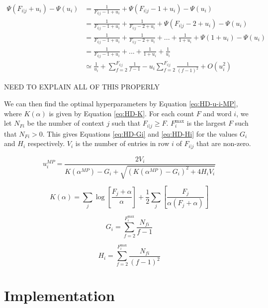 \begin{align}
\Psi(F_{i|j}+u_{i})-\Psi(u_{i})&=\frac{1}{F_{i|j}-1+u_{i}}+\Psi(F_{i|j}-1+u_{i})-\Psi(u_{i}) \nonumber
\\
&=\frac{1}{F_{i|j}-1+u_{i}}+\frac{1}{F_{i|j}-2+u_{i}}+\Psi(F_{i|j}-2+u_{i})-\Psi(u_{i}) \nonumber
\\
&=\frac{1}{F_{i|j}-1+u_{i}}+\frac{1}{F_{i|j}-2+u_{i}}+...+\frac{1}{1+u_{i}}+\Psi(1+u_{i})-\Psi(u_{i}) \nonumber
\\
&=\frac{1}{F_{i|j}-1+u_{i}}+...+\frac{1}{1+u_{i}}+\frac{1}{u_{i}} \nonumber
\\
&\simeq \frac{1}{u_{i}}+\sum_{f=2}^{F_{i|j}}\frac{1}{f-1}-u_{i}\sum_{f=2}^{F_{i|j}}\frac{1}{(f-1)^{2}}+O(u_{i}^{2})
\label{eq:HD-digamma-F-u}
\end{align}

NEED TO EXPLAIN ALL OF THIS PROPERLY


We can then find the optimal hyperparameters by Equation \ref{eq:HD-u-i-MP}, where $K(\alpha)$ is given by Equation \ref{eq:HD-K}. For each count $F$ and word $i$, we let $N_{Fi}$ be the number of context $j$ such that $F_{i|j}\geq F$. $F_{i}^{\text{max}}$ is the largest $F$ such that $N_{Fi}>0$. This gives Equations \ref{eq:HD-Gi} and \ref{eq:HD-Hi} for the values $G_{i}$ and $H_{i}$ respectively. $V_{i}$ is the number of entries in row $i$ of $F_{i|j}$ that are non-zero.

\begin{equation}
u_{i}^{MP}=\frac{2V_{i}}{K(\alpha^{MP})-G_{i}+\sqrt{(K(\alpha^{MP})-G_{i})^{2}+4H_{i}V_{i}}}
\label{eq:HD-u-i-MP}
\end{equation}

\begin{equation}
K(\alpha)=\sum_{j}\log\left[\frac{F_{j}+\alpha}{\alpha}\right]+\frac{1}{2}\sum_{j}\left[\frac{F_{j}}{\alpha(F_{j}+\alpha)}\right]
\label{eq:HD-K}
\end{equation}

\begin{equation}
G_{i}=\sum_{f=2}^{F_{i}^{\text{max}}}\frac{N_{fi}}{f-1}
\label{eq:HD-Gi}
\end{equation}

\begin{equation}
H_{i}=\sum_{f=2}^{F_{i}^{\text{max}}}\frac{N_{fi}}{(f-1)^{2}}
\label{eq:HD-Hi}
\end{equation}

\section{Implementation}

